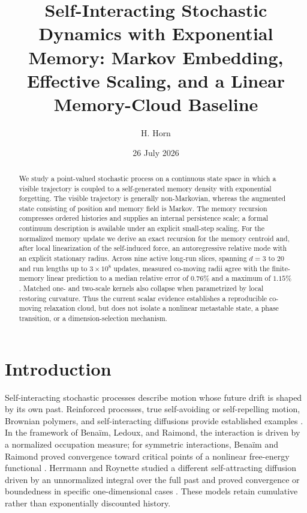 \documentclass[reprint,amsmath,amssymb,aps,prd,nofootinbib,floatfix]{revtex4-2}
\begin{document}
\title{Self-Interacting Stochastic Dynamics with Exponential Memory: Markov Embedding, Effective Scaling, and a Linear Memory-Cloud Baseline}

\author{H. Horn}

\date{26 July 2026}

\begin{abstract}
We study a point-valued stochastic process on a continuous state space in which
a visible trajectory is coupled to a self-generated memory density with
exponential forgetting.
The visible trajectory is generally non-Markovian, whereas the augmented state
consisting of position and memory field is Markov.
The memory recursion compresses ordered histories and supplies an internal
persistence scale; a formal continuum description is available under an
explicit small-step scaling.
For the normalized memory update we derive an exact recursion for the memory
centroid and, after local linearization of the self-induced force, an
autoregressive relative mode with an explicit stationary radius.
Across nine active long-run slices, spanning $d=3$ to $20$ and run lengths up
to $3\times10^8$ updates, measured co-moving radii agree with the finite-memory
linear prediction to a median relative error of $0.76\%$ and a maximum of
$1.15\%$.
Matched one- and two-scale kernels also collapse when parametrized by local
restoring curvature.
Thus the current scalar evidence establishes a reproducible co-moving
relaxation cloud, but does not isolate a nonlinear metastable state, a phase
transition, or a dimension-selection mechanism.
\end{abstract}

\maketitle

\section{Introduction}

Self-interacting stochastic processes describe motion whose future drift is
shaped by its own past.
Reinforced processes, true self-avoiding or self-repelling motion, Brownian
polymers, and self-interacting diffusions provide established examples
\cite{Pemantle2007,AmitParisiPeliti1983,TothWerner1998,
DurrettRogers1992,PelitiPietronero1987}.
In the framework of Bena\"im, Ledoux, and Raimond, the interaction is driven by
a normalized occupation measure; for symmetric interactions, Bena\"im and
Raimond proved convergence toward critical points of a nonlinear free-energy
functional \cite{BenAImRaimond2002,BenaimRaimond2005}.
Herrmann and Roynette studied a different self-attracting diffusion driven by
an unnormalized integral over the full past and proved convergence or
boundedness in specific one-dimensional cases
\cite{HerrmannRoynette2003}.
These models retain cumulative rather than exponentially discounted history.
\end{document}
